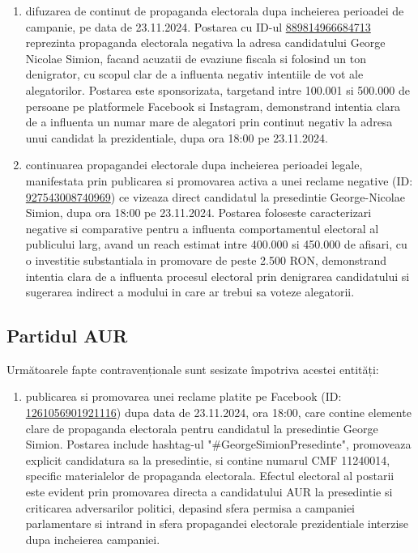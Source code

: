 \documentclass[a4paper,12pt]{article}
\begin{document}
\begin{enumerate}[leftmargin=*, label=\arabic*.)]
    \item difuzarea de continut de propaganda electorala dupa incheierea perioadei de campanie, pe data de 23.11.2024. Postarea cu ID-ul \href{https://www.facebook.com/ads/library/?id=889814966684713}{889814966684713} reprezinta propaganda electorala negativa la adresa candidatului George Nicolae Simion, facand acuzatii de evaziune fiscala si folosind un ton denigrator, cu scopul clar de a influenta negativ intentiile de vot ale alegatorilor. Postarea este sponsorizata, targetand intre 100.001 si 500.000 de persoane pe platformele Facebook si Instagram, demonstrand intentia clara de a influenta un numar mare de alegatori prin continut negativ la adresa unui candidat la prezidentiale, dupa ora 18:00 pe 23.11.2024.
    \item continuarea propagandei electorale dupa incheierea perioadei legale, manifestata prin publicarea si promovarea activa a unei reclame negative (ID: \href{https://www.facebook.com/ads/library/?id=927543008740969}{927543008740969}) ce vizeaza direct candidatul la presedintie George-Nicolae Simion, dupa ora 18:00 pe 23.11.2024. Postarea foloseste caracterizari negative si comparative pentru a influenta comportamentul electoral al publicului larg, avand un reach estimat intre 400.000 si 450.000 de afisari, cu o investitie substantiala in promovare de peste 2.500 RON, demonstrand intentia clara de a influenta procesul electoral prin denigrarea candidatului si sugerarea indirect a modului in care ar trebui sa voteze alegatorii.
\end{enumerate}

\vspace{0.5cm}

\subsection{Partidul AUR}
Următoarele fapte contravenționale sunt sesizate împotriva acestei entități:

\begin{enumerate}[leftmargin=*, label=\arabic*.)]
    \item publicarea si promovarea unei reclame platite pe Facebook (ID: \href{https://www.facebook.com/ads/library/?id=1261056901921116}{1261056901921116}) dupa data de 23.11.2024, ora 18:00, care contine elemente clare de propaganda electorala pentru candidatul la presedintie George Simion. Postarea include hashtag-ul "\#GeorgeSimionPresedinte", promoveaza explicit candidatura sa la presedintie, si contine numarul CMF 11240014, specific materialelor de propaganda electorala. Efectul electoral al postarii este evident prin promovarea directa a candidatului AUR la presedintie si criticarea adversarilor politici, depasind sfera permisa a campaniei parlamentare si intrand in sfera propagandei electorale prezidentiale interzise dupa incheierea campaniei.
\end{enumerate}
\end{document}
